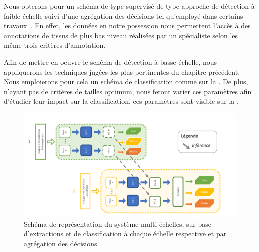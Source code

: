 Nous opterons pour un schéma de type supervisé de type approche de détection à faible échelle suivi d'une agrégation des décisions tel qu'employé dans certains travaux~\cite{Alqudah2019}. En effet, les données en notre possession nous permettent l'accès à des annotations de tissus de plus bas niveau réalisées par un spécialiste selon les même trois critères d'annotation.\par

Afin de mettre en oeuvre le schéma de détection à basse échelle, nous appliquerons les techniques jugées les plus pertinentes du chapitre précédent. Nous emploierons pour cela un schéma de classification comme sur la . De plus, n'ayant pas de critères de tailles optimum, nous feront varier ces paramètres afin d'étudier leur impact sur la classification. ces paramètres sont visible sur la .\par

\begin{figure}[H]
    \centering
    \includegraphics[width=\linewidth]{contents/chapter_5/resources/scheme_sliding_features.pdf}
    \caption{Schéma de représentation du système multi-échelles, sur base d'extractions et de classification à chaque échelle respective et par agrégation des décisions.}
    \label{fig:scheme_sliding_features}
\end{figure}\par

